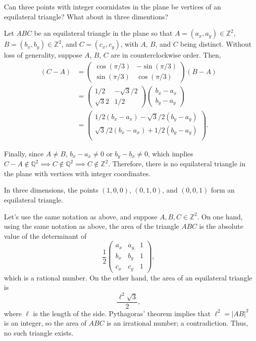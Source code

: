
\begin{prob}
	Can three points with integer coornidates in the plane be vertices of an equilateral triangle? What about in three dimentions?
\end{prob}

\begin{sol}
	Let \(ABC\) be an equilateral triangle in the plane so that \(A = (a_x, a_y) \in \mathbb{Z}^2\), \(B = (b_x, b_y) \in \mathbb{Z}^2\), and \(C = (c_x, c_y)\), with \(A\), \(B\), and \(C\) being distinct. Without loss of generality, suppose \(A\), \(B\), \(C\) are in counterclockwise order. Then,
	\begin{align*}
		(C - A) &=
		\begin{pmatrix}
			\cos(\pi/3) & -\sin(\pi/3) \\
			\sin(\pi/3) & \cos(\pi/3) 
		\end{pmatrix}
		(B - A) \\
		&=
		\begin{pmatrix}
			1/2 & -\sqrt{3}/2 \\
			\sqrt{3}{2} & 1/2 
		\end{pmatrix}
		\begin{pmatrix}
			b_x - a_x \\
			b_y - a_y
		\end{pmatrix} \\
		&=
		\begin{pmatrix}
			1/2(b_x - a_x) - \sqrt{3}/{2}(b_y-a_y) \\
			\sqrt{3}/2(b_x - a_x) + 1/2(b_y-a_y) \\
		\end{pmatrix}.
	\end{align*}

	Finally, since \(A \neq B\), \(b_x - a_x \neq 0\) or \(b_y - b_x \neq 0\), which implies \(C - A \notin \mathbb{Q}^2 \implies C \notin \mathbb{Q}^2 \implies C \notin \mathbb{Z}^2\). Therefore, there is no equilateral triangle in the plane with vertices with integer coordinates.

	In three dimensions, the points \((1, 0, 0)\), \((0, 1, 0)\), and \((0, 0, 1)\) form an equilateral triangle.
\end{sol}

\begin{sol}
	Let's use the same notation as above, and suppose \(A, B, C \in \mathbb{Z}^2\).
	On one hand, using the same notation as above, the area of the triangle \(ABC\) is the absolute value of the determinant of \[
		\frac{1}{2}\begin{pmatrix}
			a_x&a_y&1 \\
			b_x&b_y&1 \\
			c_x&c_y&1
		\end{pmatrix},
	\]
	which is a rational number.
	On the other hand, the area of an equilateral triangle is \[
		\frac{\ell^2 \sqrt{3}}{2},
	\]
	where \(\ell\) is the length of the side. Pythagoras' theorem implies that \(\ell^2 = |AB|^2\) is an integer, so the area of \(ABC\) is an irrational number; a contradiction. Thus, no such triangle exists.
\end{sol}
